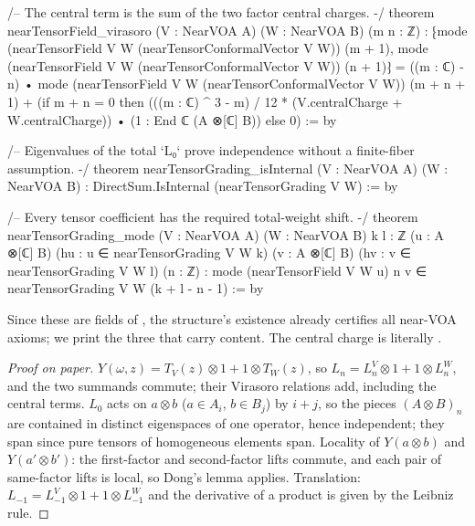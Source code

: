 \begin{leancode}
/-- The central term is the sum of the two factor central charges. -/
theorem nearTensorField_virasoro (V : NearVOA A) (W : NearVOA B) (m n : ℤ) :
    ⁅mode (nearTensorField V W (nearTensorConformalVector V W)) (m + 1),
      mode (nearTensorField V W (nearTensorConformalVector V W)) (n + 1)⁆ =
      ((m : ℂ) - n) •
        mode (nearTensorField V W (nearTensorConformalVector V W)) (m + n + 1) +
      (if m + n = 0 then
        (((m : ℂ) ^ 3 - m) / 12 * (V.centralCharge + W.centralCharge)) •
          (1 : End ℂ (A ⊗[ℂ] B)) else 0) := by

/-- Eigenvalues of the total `L₀` prove independence without a finite-fiber assumption. -/
theorem nearTensorGrading_isInternal (V : NearVOA A) (W : NearVOA B) :
    DirectSum.IsInternal (nearTensorGrading V W) := by

/-- Every tensor coefficient has the required total-weight shift. -/
theorem nearTensorGrading_mode (V : NearVOA A) (W : NearVOA B)
    {k l : ℤ} (u : A ⊗[ℂ] B) (hu : u ∈ nearTensorGrading V W k)
    (v : A ⊗[ℂ] B) (hv : v ∈ nearTensorGrading V W l) (n : ℤ) :
    mode (nearTensorField V W u) n v ∈ nearTensorGrading V W (k + l - n - 1) := by
\end{leancode}

\begin{dictionary}
Since these are fields of , the structure's existence already certifies all near-VOA axioms;
we print the three that carry content.  The central charge is literally .
\end{dictionary}

\begin{proof}[Proof on paper]
$Y(\omega,z)=T_V(z)\otimes1+1\otimes T_W(z)$, so $L_n=L^V_n\otimes1+1\otimes L^W_n$, and the two summands commute; their
Virasoro relations add, including the central terms.  $L_0$ acts on $a\otimes b$ ($a\in A_i$, $b\in B_j$) by $i+j$, so the
pieces $(A\otimes B)_n$ are contained in distinct eigenspaces of one operator, hence independent; they span since
pure tensors of homogeneous elements span.  Locality of $Y(a\otimes b)$ and $Y(a'\otimes b')$: the first-factor and
second-factor lifts commute, and each pair of same-factor lifts is local, so Dong's lemma applies.  Translation:
$L_{-1}=L^V_{-1}\otimes1+1\otimes L^W_{-1}$ and the derivative of a product is given by the Leibniz rule.
\end{proof}

